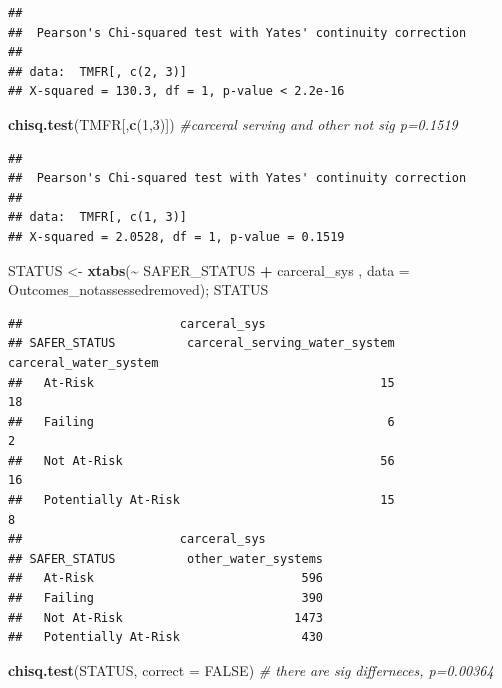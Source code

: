 \documentclass[
]{article}
\newenvironment{Shaded}{\begin{snugshade}}{\end{snugshade}}
\newcommand{\AttributeTok}[1]{\textcolor[rgb]{0.13,0.29,0.53}{#1}}
\newcommand{\CommentTok}[1]{\textcolor[rgb]{0.56,0.35,0.01}{\textit{#1}}}
\newcommand{\ConstantTok}[1]{\textcolor[rgb]{0.56,0.35,0.01}{#1}}
\newcommand{\DecValTok}[1]{\textcolor[rgb]{0.00,0.00,0.81}{#1}}
\newcommand{\FunctionTok}[1]{\textcolor[rgb]{0.13,0.29,0.53}{\textbf{#1}}}
\newcommand{\NormalTok}[1]{#1}
\newcommand{\OtherTok}[1]{\textcolor[rgb]{0.56,0.35,0.01}{#1}}
\newcommand{\SpecialCharTok}[1]{\textcolor[rgb]{0.81,0.36,0.00}{\textbf{#1}}}
\begin{document}
\begin{verbatim}
## 
##  Pearson's Chi-squared test with Yates' continuity correction
## 
## data:  TMFR[, c(2, 3)]
## X-squared = 130.3, df = 1, p-value < 2.2e-16
\end{verbatim}

\begin{Shaded}
\begin{Highlighting}[]
\FunctionTok{chisq.test}\NormalTok{(TMFR[,}\FunctionTok{c}\NormalTok{(}\DecValTok{1}\NormalTok{,}\DecValTok{3}\NormalTok{)]) }\CommentTok{\#carceral serving and other not sig p=0.1519}
\end{Highlighting}
\end{Shaded}

\begin{verbatim}
## 
##  Pearson's Chi-squared test with Yates' continuity correction
## 
## data:  TMFR[, c(1, 3)]
## X-squared = 2.0528, df = 1, p-value = 0.1519
\end{verbatim}

\begin{Shaded}
\begin{Highlighting}[]
\NormalTok{STATUS }\OtherTok{\textless{}{-}} \FunctionTok{xtabs}\NormalTok{(}\SpecialCharTok{\textasciitilde{}}\NormalTok{ SAFER\_STATUS }\SpecialCharTok{+}\NormalTok{ carceral\_sys , }\AttributeTok{data =}\NormalTok{ Outcomes\_notassessedremoved); STATUS}
\end{Highlighting}
\end{Shaded}

\begin{verbatim}
##                      carceral_sys
## SAFER_STATUS          carceral_serving_water_system carceral_water_system
##   At-Risk                                        15                    18
##   Failing                                         6                     2
##   Not At-Risk                                    56                    16
##   Potentially At-Risk                            15                     8
##                      carceral_sys
## SAFER_STATUS          other_water_systems
##   At-Risk                             596
##   Failing                             390
##   Not At-Risk                        1473
##   Potentially At-Risk                 430
\end{verbatim}

\begin{Shaded}
\begin{Highlighting}[]
\FunctionTok{chisq.test}\NormalTok{(STATUS, }\AttributeTok{correct =} \ConstantTok{FALSE}\NormalTok{) }\CommentTok{\# there are sig differneces, p=0.00364}
\end{Highlighting}
\end{Shaded}
\end{document}
